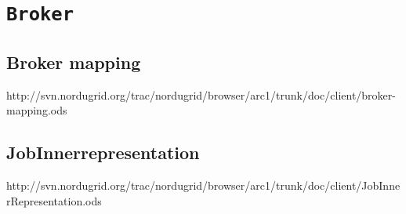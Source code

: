 \documentclass{book}
\newcommand{\Broker}{\texttt{Broker}}
\begin{document}
\chapter{{\Broker}}
\label{app:broker}

\section{Broker mapping}
\label{sec:broker-mapping}

http://svn.nordugrid.org/trac/nordugrid/browser/arc1/trunk/doc/client/broker-mapping.ods

\section{JobInnerrepresentation}
\label{sec:jobinnerrepresentation}

http://svn.nordugrid.org/trac/nordugrid/browser/arc1/trunk/doc/client/JobInnerRepresentation.ods


\end{document}
